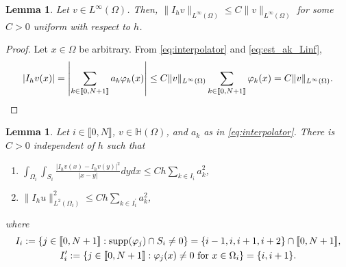 \documentclass[11 pt]{article}
\newcommand\inter[1]{\llbracket #1\rrbracket}
\newtheorem{lemma}[theorem]{Lemma}
\numberwithin{equation}{section}
\begin{document}
\begin{lemma}\label{lem:inter_l_infty}
    Let $v\in L^\infty(\Omega)$. Then, $\|I_h v\|_{L^\infty(\Omega)}\leq C\|v\|_{L^\infty(\Omega)}$ for some $C>0$ uniform with respect to $h$.
\end{lemma}
%
\begin{proof}
Let $x\in \Omega$ be arbitrary. From \eqref{eq:interpolator} and \eqref{eq:est_ak_Linf},
\begin{equation*}
|I_h v(x)|
=\left|\sum_{k\in\inter{0,N+1}}a_k \varphi_k(x)\right|
\leq C\|v\|_{L^\infty(\Omega)}\sum_{k\in\inter{0,N+1}}\varphi_k(x)=C\|v\|_{L^\infty(\Omega)}. \qedhere
\end{equation*}
\end{proof}

\begin{lemma}\label{lem:loc_norm_interp}
Let $i\in\inter{0,N}$, $v\in \mathbb H(\Omega)$, and $a_k$ as in \eqref{eq:interpolator}.  There is $C>0$ independent of $h$ such that
%
\begin{enumerate}[label=\upshape(\roman*)]
\item $\displaystyle \int_{\Omega_i}\int_{S_i}\frac{|I_hv(x)-I_hv(y)|^2}{|x-y|}dy dx\leq Ch\sum_{k\in I_i} a_k^2$,
\item  $\displaystyle \|I_h u\|^2_{L^2(\Omega_i)}\leq Ch\sum_{k\in I_i^\prime} a_k^2$,
\end{enumerate}
where
%
\begin{gather}\label{def_Ii}
I_i:=\{j\in\inter{0,N+1}:\operatorname{supp}(\varphi_j)\cap S_i\neq 0\}=\{i-1,i,i+1,i+2\}\cap \inter{0,N+1}, \\ \label{def_Iiprime}
I^\prime_i:=\{j\in\inter{0,N+1}:\varphi_j(x)\neq 0 \ \textnormal{for $x\in \Omega_i$}\}=\{i,i+1\}.
\end{gather}
%
\end{lemma}
\end{document}
